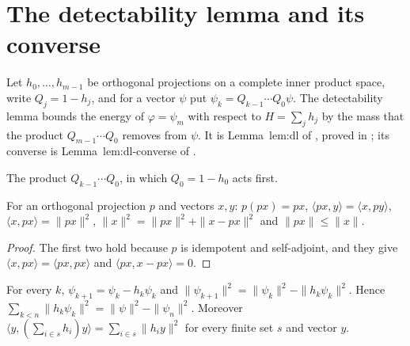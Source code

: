 \section{The detectability lemma and its converse}

Let $h_0,\dots,h_{m-1}$ be orthogonal projections on a complete inner
product space, write $Q_j=1-h_j$, and for a vector $\psi$ put
$\psi_k=Q_{k-1}\cdots Q_0\psi$. The detectability lemma bounds the energy
of $\varphi=\psi_m$ with respect to $H=\sum_jh_j$ by the mass that the
product $Q_{m-1}\cdots Q_0$ removes from $\psi$. It is Lemma~lem:dl of
\cite[lines 1508--1519]{Arad2016RigorousRG}, proved in
\cite{Anshu2016Simple}; its converse is Lemma~lem:dl-converse of
\cite[lines 1528--1537]{Arad2016RigorousRG}.

\begin{definition}
    \label{def:complement_product}
    \leanok
    The product $Q_{k-1}\cdots Q_0$, in which $Q_0=1-h_0$ acts first.
\end{definition}

\begin{theorem}
    \label{thm:star_projection_identities}
    \leanok
    For an orthogonal projection $p$ and vectors $x,y$:
    $p(px)=px$, $\langle px,y\rangle=\langle x,py\rangle$,
    $\langle x,px\rangle=\|px\|^2$, $\|x\|^2=\|px\|^2+\|x-px\|^2$ and
    $\|px\|\le\|x\|$.
\end{theorem}

\begin{proof}
    \leanok
    The first two hold because $p$ is idempotent and self-adjoint, and they
    give $\langle x,px\rangle=\langle px,px\rangle$ and
    $\langle px,x-px\rangle=0$.
\end{proof}

\begin{theorem}
    \label{thm:complement_product_removed_mass}
    \leanok
    For every $k$, $\psi_{k+1}=\psi_k-h_k\psi_k$ and
    $\|\psi_{k+1}\|^2=\|\psi_k\|^2-\|h_k\psi_k\|^2$. Hence
    $\sum_{k<n}\|h_k\psi_k\|^2=\|\psi\|^2-\|\psi_n\|^2$. Moreover
    $\langle y,(\sum_{i\in s}h_i)y\rangle=\sum_{i\in s}\|h_iy\|^2$ for every
    finite set $s$ and vector $y$.
\end{theorem}

